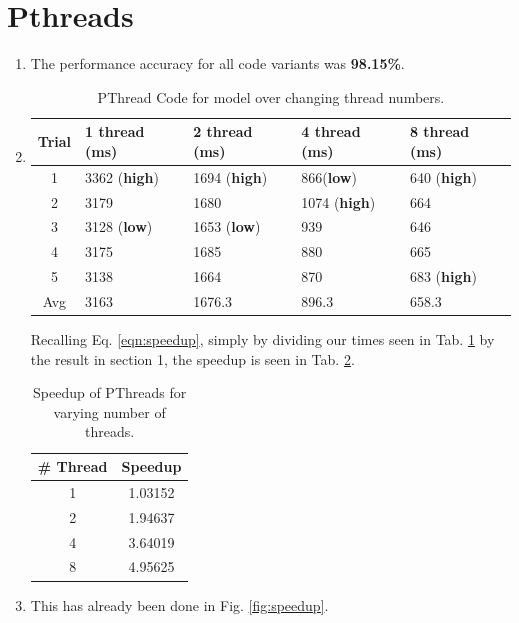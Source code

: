 \documentclass[a4paper,12pt]{article}
\theoremstyle{definition}
\theoremstyle{remark}
\begin{document}
		\section{Pthreads}
		\begin{enumerate}
			\item The performance accuracy for all code variants was \textbf{98.15\%}.
			\item \begin{table}[h]
				\centering
				\begin{tabular}{|c|l|l|l|l|}
					\hline
					\textbf{Trial}& \textbf{1 thread (ms)}  &\textbf{2 thread (ms)}  &\textbf{4  thread (ms)}  &\textbf{8 thread (ms)}  \\
					\hline\hline
					1&  3362 (\textbf{high})& 1694 (\textbf{high}) & 866(\textbf{low}) &640  (\textbf{high})\\
					2& 3179 &1680 & 1074 (\textbf{high}) &664   \\
					3&  3128 (\textbf{low})&  1653 (\textbf{low}) &  939 & 646  \\
					4&  3175& 1685 &880  &665  \\
					5&  3138& 1664 &  870 & 683 (\textbf{high}) \\
					\hline
					Avg&  3163&1676.3  &896.3 & 658.3 \\
					\hline
				\end{tabular}
				\caption{PThread Code for model over changing thread numbers.}
				\label{tab:Ptheads}
			\end{table}
			Recalling Eq. \ref{eqn:speedup}, simply by dividing our times seen in Tab. \ref{tab:Ptheads} by the result in section 1, the speedup is seen in Tab. \ref{tab:speedPT}.
			\begin{table}[h]
			\centering
			\begin{tabular}{|c|c|}
				\hline
				\textbf{\# Thread}& \textbf{Speedup}  \\
				\hline\hline
				1&  1.03152 \\
				2&   1.94637\\
				4&   3.64019\\
				8&   4.95625\\\hline
			\end{tabular}
			\caption{Speedup of PThreads for varying number of threads.}
			\label{tab:speedPT}
			\end{table}
			\item This has already been done in Fig. \ref{fig:speedup}.
		\end{enumerate}
\end{document}
